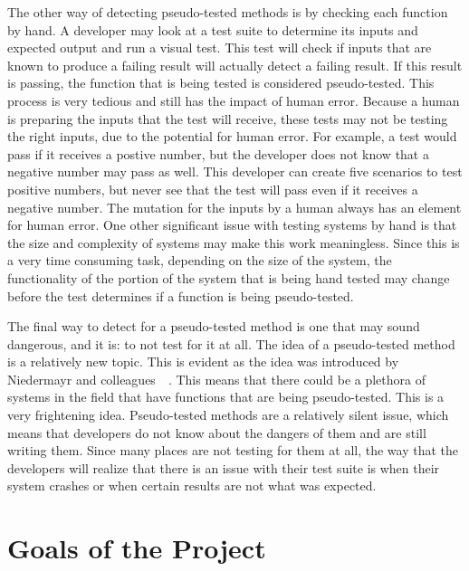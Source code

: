 The other way of detecting pseudo-tested methods is by checking each function by hand. A developer may look at a test suite to determine its inputs and expected output and run a visual test. This test will check if inputs that are known to produce a failing result will actually detect a failing result. If this result is passing, the function that is being tested is considered pseudo-tested. This process is very tedious and still has the impact of human error. Because a human is preparing the inputs that the test will receive, these tests may not be testing the right inputs, due to the potential for human error. For example, a test would pass if it receives a postive number, but the developer does not know that a negative number may pass as well. This developer can create five scenarios to test positive numbers, but never see that the test will pass even if it receives a negative number. The mutation for the inputs by a human always has an element for human error. One other significant issue with testing systems by hand is that the size and complexity of systems may make this work meaningless. Since this is a very time consuming task, depending on the size of the system, the functionality of the portion of the system that is being hand tested may change before the test determines if a function is being pseudo-tested.

The final way to detect for a pseudo-tested method is one that may sound dangerous, and it is: to not test for it at all. The idea of a pseudo-tested method is a relatively new topic. This is evident as the idea was introduced by Niedermayr and colleagues~\cite{niedermayr2016will}~\cite{vera2017comprehensive}. This means that there could be a plethora of systems in the field that have functions that are being pseudo-tested. This is a very frightening idea. Pseudo-tested methods are a relatively silent issue, which means that developers do not know about the dangers of them and are still writing them. Since many places are not testing for them at all, the way that the developers will realize that there is an issue with their test suite is when their system crashes or when certain results are not what was expected.

\section{Goals of the Project}\label{sec:goals}


